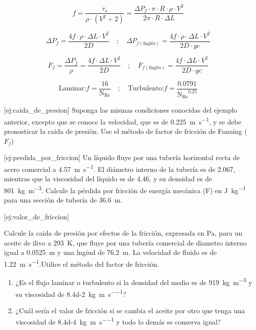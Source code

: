 \documentclass{AsignaturaResumen}
\begin{document}
\begin{equation}
    f = \frac{\tau_{s}}{\rho \cdot (V^{2} \div 2)} = \frac{\Delta P_{f} \cdot \pi \cdot R \cdot \rho \cdot V^{2}}{2\pi \cdot R \cdot \Delta L}
\end{equation}

\begin{equation}
    \Delta P_{f} = \frac{4f \cdot \rho \cdot \Delta L \cdot V^2}{2D} \quad;\quad \Delta P_{f(\text{Inglés})} = \frac{4f \cdot \rho \cdot \Delta L \cdot V^2}{2D \cdot gc}
\end{equation}

\begin{equation}
    F_{f} = \frac{\Delta P_{f}}{\rho} = \frac{4f \cdot \Delta L \cdot V^2}{2D} \quad;\quad F_{f(\text{Inglés})} = \frac{4f \cdot \Delta L \cdot V^2}{2D \cdot gc}
\end{equation}

\begin{equation}
    \text{Laminar:} f = \frac{16}{\mathrm{N_{Re}}} \quad;\quad \text{Turbulento:} f = \frac{0.0791}{\mathrm{N_{Re}}^{0.25}}
\end{equation}


[ej:caida_de_presion]{
    Suponga las mismas condiciones conocidas del ejemplo anterior, excepto que se conoce la velocidad, que es de \qty{0.225}{\m\per\s}, y se debe pronosticar la caida de presión. Use el método de factor de fricción de Fanning ($F_{f}$)
}

[ej:perdida_por_friccion]{
    Un líquido fluye por una tubería horizontal recta de acero comercial a \qty{4.57}{\m\per\s}. El diámetro interno de la tubería es de \qty{2.067}{\in}, mientras que la viscosidad del líquido es de \qty{4.46}{\cp}, y su densidad es de \qty{801}{\kg\per\m\cubed}. Calcule la pérdida por fricción de energía mecánica (F) en \unit{\J\per\kg} para una sección de tubería de \qty{36.6}{\m}.
}

[ej:valor_de_friccion]{
    Calcule la caida de presión por efectos de la fricción, expresada en \unit{\pascal}, para un aceite de ilivo a \qty{293}{\K}, que fluye por una tubería comercial de diametro interno igual a \qty{0.0525}{\m} y una lngiud de \qty{76.2}{\m}. La velocidad de fluido es de \qty{1.22}{\m\per\s}.Utilice el método del factor de fricción.
    \begin{enumerate}
        \item ¿Es el flujo laminar o turbulento si la densidad del medio es de \qty{919}{\kg\per\m\cubed} y su viscosidad de \qty{8.4d-2}{\kg\per\m\per\s}?
        \item ¿Cuál sería el valor de fricción si se cambia el aceite por otro que tenga una viscosidad de \qty{8.4d-4}{\kg\per\m\per\s} y todo lo demás se conserva igual?
    \end{enumerate}
}
\end{document}

